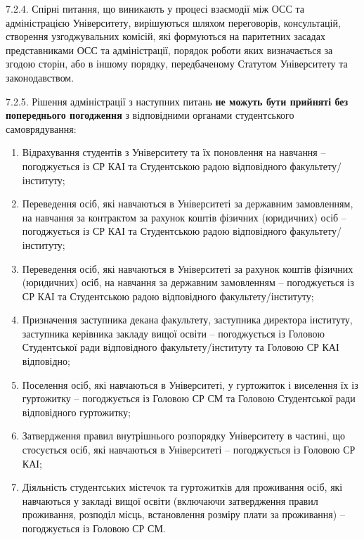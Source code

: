     7.2.4. Спірні питання, що виникають у процесі взаємодії між ОСС та адміністрацією Університету, вирішуються шляхом переговорів, консультацій, створення узгоджувальних комісій, які формуються на паритетних засадах представниками ОСС та адміністрації, порядок роботи яких визначається за згодою сторін, або в іншому порядку, передбаченому Статутом Університету та законодавством.

    7.2.5. Рішення адміністрації з наступних питань \textbf{не можуть бути прийняті без попереднього погодження} з відповідними органами студентського самоврядування:

        \begin{enumerate}[label=\arabic*)]
            \item Відрахування студентів з Університету та їх поновлення на навчання -- погоджується із СР КАІ та Студентською радою відповідного факультету/інституту;
            \item Переведення осіб, які навчаються в Університеті за державним замовленням, на навчання за контрактом за рахунок коштів фізичних (юридичних) осіб -- погоджується із СР КАІ та Студентською радою відповідного факультету/інституту;
            \item Переведення осіб, які навчаються в Університеті за рахунок коштів фізичних (юридичних) осіб, на навчання за державним замовленням -- погоджується із СР КАІ та Студентською радою відповідного факультету/інституту;
            \item Призначення заступника декана факультету, заступника директора інституту, заступника керівника закладу вищої освіти -- погоджується із Головою Студентської ради відповідного факультету/інституту та Головою СР КАІ відповідно;
            \item Поселення осіб, які навчаються в Університеті, у гуртожиток і виселення їх із гуртожитку -- погоджується із Головою СР СМ та Головою Студентської ради відповідного гуртожитку;
            \item Затвердження правил внутрішнього розпорядку Університету в частині, що стосується осіб, які навчаються в Університеті -- погоджується із Головою СР КАІ;
            \item Діяльність студентських містечок та гуртожитків для проживання осіб, які навчаються у закладі вищої освіти (включаючи затвердження правил проживання, розподіл місць, встановлення розміру плати за проживання) -- погоджується із Головою СР СМ.
        \end{enumerate}

